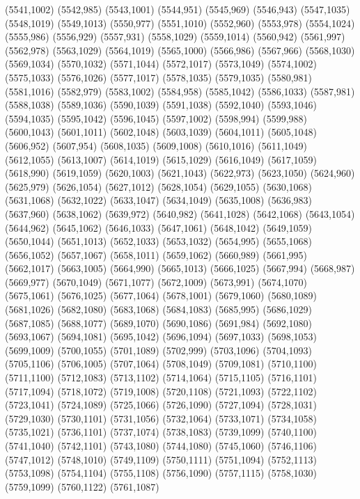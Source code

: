 (5541,1002)
(5542,985)
(5543,1001)
(5544,951)
(5545,969)
(5546,943)
(5547,1035)
(5548,1019)
(5549,1013)
(5550,977)
(5551,1010)
(5552,960)
(5553,978)
(5554,1024)
(5555,986)
(5556,929)
(5557,931)
(5558,1029)
(5559,1014)
(5560,942)
(5561,997)
(5562,978)
(5563,1029)
(5564,1019)
(5565,1000)
(5566,986)
(5567,966)
(5568,1030)
(5569,1034)
(5570,1032)
(5571,1044)
(5572,1017)
(5573,1049)
(5574,1002)
(5575,1033)
(5576,1026)
(5577,1017)
(5578,1035)
(5579,1035)
(5580,981)
(5581,1016)
(5582,979)
(5583,1002)
(5584,958)
(5585,1042)
(5586,1033)
(5587,981)
(5588,1038)
(5589,1036)
(5590,1039)
(5591,1038)
(5592,1040)
(5593,1046)
(5594,1035)
(5595,1042)
(5596,1045)
(5597,1002)
(5598,994)
(5599,988)
(5600,1043)
(5601,1011)
(5602,1048)
(5603,1039)
(5604,1011)
(5605,1048)
(5606,952)
(5607,954)
(5608,1035)
(5609,1008)
(5610,1016)
(5611,1049)
(5612,1055)
(5613,1007)
(5614,1019)
(5615,1029)
(5616,1049)
(5617,1059)
(5618,990)
(5619,1059)
(5620,1003)
(5621,1043)
(5622,973)
(5623,1050)
(5624,960)
(5625,979)
(5626,1054)
(5627,1012)
(5628,1054)
(5629,1055)
(5630,1068)
(5631,1068)
(5632,1022)
(5633,1047)
(5634,1049)
(5635,1008)
(5636,983)
(5637,960)
(5638,1062)
(5639,972)
(5640,982)
(5641,1028)
(5642,1068)
(5643,1054)
(5644,962)
(5645,1062)
(5646,1033)
(5647,1061)
(5648,1042)
(5649,1059)
(5650,1044)
(5651,1013)
(5652,1033)
(5653,1032)
(5654,995)
(5655,1068)
(5656,1052)
(5657,1067)
(5658,1011)
(5659,1062)
(5660,989)
(5661,995)
(5662,1017)
(5663,1005)
(5664,990)
(5665,1013)
(5666,1025)
(5667,994)
(5668,987)
(5669,977)
(5670,1049)
(5671,1077)
(5672,1009)
(5673,991)
(5674,1070)
(5675,1061)
(5676,1025)
(5677,1064)
(5678,1001)
(5679,1060)
(5680,1089)
(5681,1026)
(5682,1080)
(5683,1068)
(5684,1083)
(5685,995)
(5686,1029)
(5687,1085)
(5688,1077)
(5689,1070)
(5690,1086)
(5691,984)
(5692,1080)
(5693,1067)
(5694,1081)
(5695,1042)
(5696,1094)
(5697,1033)
(5698,1053)
(5699,1009)
(5700,1055)
(5701,1089)
(5702,999)
(5703,1096)
(5704,1093)
(5705,1106)
(5706,1005)
(5707,1064)
(5708,1049)
(5709,1081)
(5710,1100)
(5711,1100)
(5712,1083)
(5713,1102)
(5714,1064)
(5715,1105)
(5716,1101)
(5717,1094)
(5718,1072)
(5719,1008)
(5720,1108)
(5721,1093)
(5722,1102)
(5723,1041)
(5724,1089)
(5725,1066)
(5726,1090)
(5727,1094)
(5728,1031)
(5729,1030)
(5730,1101)
(5731,1056)
(5732,1064)
(5733,1071)
(5734,1058)
(5735,1021)
(5736,1101)
(5737,1074)
(5738,1083)
(5739,1099)
(5740,1100)
(5741,1040)
(5742,1101)
(5743,1080)
(5744,1080)
(5745,1060)
(5746,1106)
(5747,1012)
(5748,1010)
(5749,1109)
(5750,1111)
(5751,1094)
(5752,1113)
(5753,1098)
(5754,1104)
(5755,1108)
(5756,1090)
(5757,1115)
(5758,1030)
(5759,1099)
(5760,1122)
(5761,1087)
